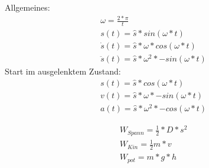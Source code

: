 \documentclass{article}
\begin{document}
Allgemeines:
\begin{gather*}
    \omega = \frac{2*\pi}{t}\\
    s(t) = \hat{s} * sin(\omega*t)\\
    \dot{s}(t) = \hat{s} * \omega * cos(\omega*t)\\
    \ddot{s}(t) = \hat{s} * \omega^2 * -sin(\omega*t)
\end{gather*}
Start im ausgelenktem Zustand:
\begin{gather*}
    s(t) = \hat{s} * cos(\omega*t)\\
    v(t) = \hat{s} * \omega * -sin(\omega*t)\\
    a(t) = \hat{s} * \omega^2 * -cos(\omega*t)
\end{gather*}

\begin{gather*}
    W_{Spann} = \frac{1}{2} * D * s^2\\
    W_{Kin} = \frac{1}{2}  m * v\\
    W_{pot} = m*g*h
\end{gather*}
\end{document}
